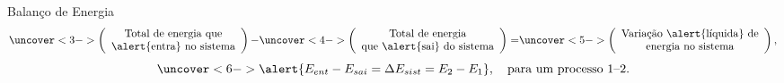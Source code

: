     \begin{frame}{Balanço de Energia}\vspace*{-2em}
        \\[\medskipamount]
        \begin{equation*}%
            \uncover<3->{\left(\begin{array}{c}
                \text{Total de energia que} \\
                \text{\alert{entra} no sistema}
            \end{array}\right)-}
            \uncover<4->{\left(\begin{array}{c}
                \text{Total de energia} \\
                \text{que \alert{sai} do sistema}
            \end{array}\right)=}
            \uncover<5->{\left(\begin{array}{c}
                \text{Variação \alert{líquida} de} \\
                \text{energia no sistema}
            \end{array}\right),}%
        \end{equation*}%
        \begin{equation*}%
            \uncover<6->{\alert{E_{ent} - E_{sai} = \Delta{E}_{sist} = E_2 -
            E_1},\quad\mbox{para um processo $1$--$2$.}}%
        \end{equation*}%
    \end{frame}

